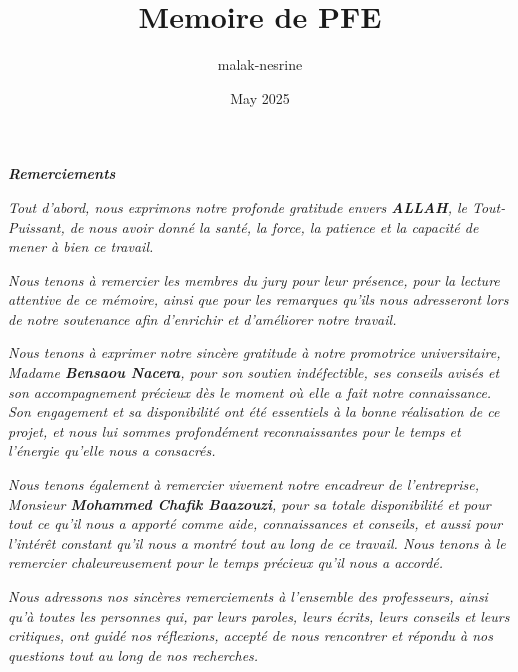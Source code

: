 \documentclass{article}
\title{Memoire de PFE}
\author{malak-nesrine}
\date{May 2025}
\begin{document}



\newpage
\cleardoublepage


\thispagestyle{empty}


\begin{center}
{\Huge \textbf{\textit{Remerciements}}}

\vspace{2cm} 
\fontsize{14pt}{16pt}\selectfont\textit{Tout d’abord, nous exprimons notre profonde gratitude envers \textbf{ALLAH}, le Tout-Puissant, de nous avoir donné la santé, la force, la patience et la capacité de mener à bien ce travail.
}

\vspace{1cm}
\fontsize{14pt}{16pt}\selectfont\textit{Nous tenons à remercier les membres du jury pour leur présence, pour la lecture attentive de ce mémoire, ainsi que pour les remarques qu’ils nous adresseront lors de notre soutenance afin d’enrichir et d’améliorer notre travail.}

\vspace{1cm}
\fontsize{14pt}{16pt}\selectfont\textit{Nous tenons à exprimer notre sincère gratitude à notre promotrice universitaire, Madame \textbf{Bensaou Nacera}, pour son soutien indéfectible, ses conseils avisés et son accompagnement précieux dès le moment où elle a fait notre connaissance. Son engagement et sa disponibilité ont été essentiels à la bonne réalisation de ce projet, et nous lui sommes profondément reconnaissantes pour le temps et l’énergie qu’elle nous a consacrés.} 

\vspace{1cm}
\fontsize{14pt}{16pt}\selectfont\textit{Nous tenons également à remercier vivement notre encadreur de l’entreprise, Monsieur \textbf{ Mohammed Chafik Baazouzi}, pour sa totale disponibilité et pour tout ce qu’il nous a apporté comme aide, connaissances et conseils, et aussi pour l'intérêt constant qu'il nous a montré tout au long de ce travail. Nous tenons à le remercier chaleureusement pour le temps précieux qu'il nous a accordé.}

\vspace{1cm}

\fontsize{14pt}{16pt}\selectfont\textit{Nous adressons nos sincères remerciements à l’ensemble des professeurs, ainsi qu’à toutes les personnes qui, par leurs paroles, leurs écrits, leurs conseils et leurs critiques, ont guidé nos réflexions, accepté de nous rencontrer et répondu à nos questions tout au long de nos recherches.}


\end{center}
\end{document}
